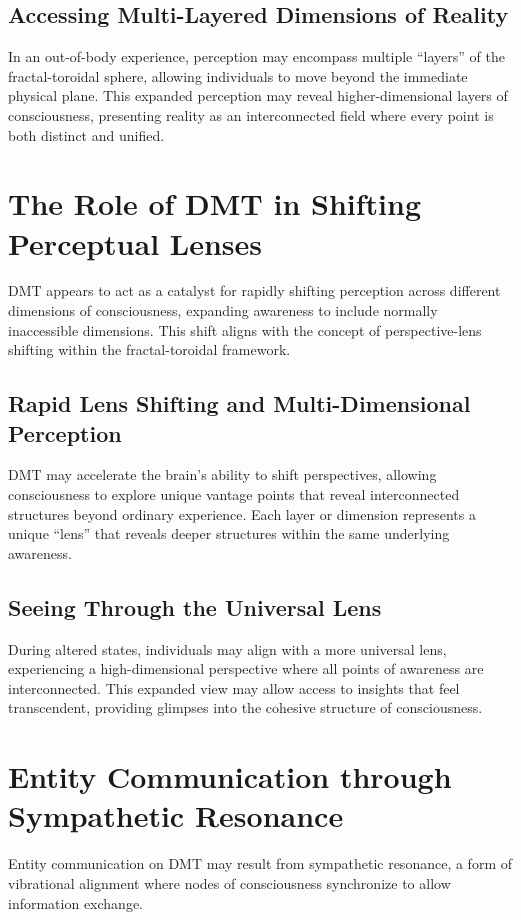 \documentclass{article}
\begin{document}
\subsection{Accessing Multi-Layered Dimensions of Reality}
In an out-of-body experience, perception may encompass multiple “layers” of the fractal-toroidal sphere, allowing individuals to move beyond the immediate physical plane. This expanded perception may reveal higher-dimensional layers of consciousness, presenting reality as an interconnected field where every point is both distinct and unified.

\section{The Role of DMT in Shifting Perceptual Lenses}
DMT appears to act as a catalyst for rapidly shifting perception across different dimensions of consciousness, expanding awareness to include normally inaccessible dimensions. This shift aligns with the concept of perspective-lens shifting within the fractal-toroidal framework.

\subsection{Rapid Lens Shifting and Multi-Dimensional Perception}
DMT may accelerate the brain’s ability to shift perspectives, allowing consciousness to explore unique vantage points that reveal interconnected structures beyond ordinary experience. Each layer or dimension represents a unique “lens” that reveals deeper structures within the same underlying awareness.

\subsection{Seeing Through the Universal Lens}
During altered states, individuals may align with a more universal lens, experiencing a high-dimensional perspective where all points of awareness are interconnected. This expanded view may allow access to insights that feel transcendent, providing glimpses into the cohesive structure of consciousness.

\section{Entity Communication through Sympathetic Resonance}
Entity communication on DMT may result from sympathetic resonance, a form of vibrational alignment where nodes of consciousness synchronize to allow information exchange.
\end{document}
